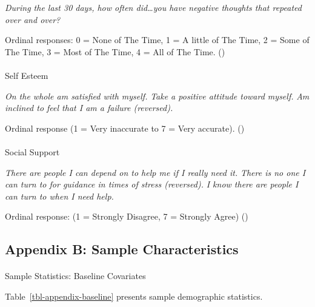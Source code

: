 \documentclass[
  single column]{article}
\makeatletter
\let\oldparagraph\paragraph
\renewcommand{\paragraph}{
    \@ifstar
      \xxxParagraphStar
      \xxxParagraphNoStar
  }
\newcommand{\xxxParagraphStar}[1]{\oldparagraph*{#1}\mbox{}}
\newcommand{\xxxParagraphNoStar}[1]{\oldparagraph{#1}\mbox{}}
\makeatother
\begin{document}
\emph{During the last 30 days, how often did\ldots you have negative
thoughts that repeated over and over?}

Ordinal responses: 0 = None of The Time, 1 = A little of The Time, 2 =
Some of The Time, 3 = Most of The Time, 4 = All of The Time.
()

\paragraph{Self Esteem}\label{self-esteem}

\emph{On the whole am satisfied with myself.} \emph{Take a positive
attitude toward myself.} \emph{Am inclined to feel that I am a failure
(reversed).}

Ordinal response (1 = Very inaccurate to 7 = Very accurate).
()

\paragraph{Social Support}\label{social-support}

\emph{There are people I can depend on to help me if I really need it.}
\emph{There is no one I can turn to for guidance in times of stress
(reversed).} \emph{I know there are people I can turn to when I need
help.}

Ordinal response: (1 = Strongly Disagree, 7 = Strongly Agree)
()

\newpage{}

\subsection{Appendix B: Sample Characteristics}\label{appendix-sample}

\paragraph{Sample Statistics: Baseline
Covariates}\label{sample-statistics-baseline-covariates}

Table~\ref{tbl-appendix-baseline} presents sample demographic
statistics.
\end{document}
